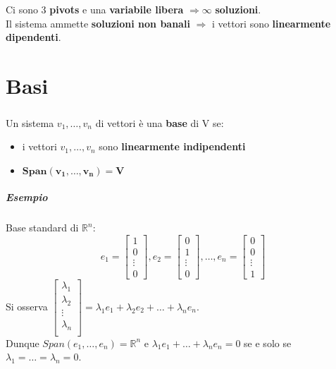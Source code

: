 \documentclass[a4paper, 12pt]{report}
\begin{document}
                Ci sono 3 \textbf{pivots} e una \textbf{variabile libera} $\Rightarrow \boldsymbol{\infty}$ \textbf{soluzioni}.\\
                Il sistema ammette \textbf{soluzioni non banali} $\Rightarrow$ i vettori sono \textbf{linearmente dipendenti}.
    \chapter{Basi}
            \paragraph{}Un sistema $v_1,\dots,v_n$ di vettori è una \textbf{base} di V se:
            \begin{itemize}
                \item i vettori $v_1,\dots,v_n$ sono \textbf{linearmente indipendenti}
                \item $\boldsymbol{Span(v_1,\dots,v_n) = V}$
            \end{itemize}
            \paragraph{Esempio} Base standard di $\mathbb{R}^n$:
                $$
                e_1=
                \begin{bmatrix}
                    1\\
                    0\\
                    \vdots\\
                    0
                \end{bmatrix}
                ,e_2=
                \begin{bmatrix}
                    0\\
                    1\\
                    \vdots\\
                    0
                \end{bmatrix}
                ,\dots,e_n=
                \begin{bmatrix}
                    0\\
                    0\\
                    \vdots\\
                    1
                \end{bmatrix}
                $$
                Si osserva $
                    \begin{bmatrix}
                        \lambda_1\\
                        \lambda_2\\
                        \vdots\\
                        \lambda_n\\
                    \end{bmatrix}
                = \lambda_1 e_1+\lambda_2 e_2+\dots+\lambda_n e_n.
                $\\
                Dunque $Span (e_1,\dots,e_n)=\mathbb{R}^n$ e 
                $\lambda_1 e_1+\dots+\lambda_n e_n=0$ 
                se e solo se \\$\lambda_1=\dots=\lambda_n=0$.
\end{document}
